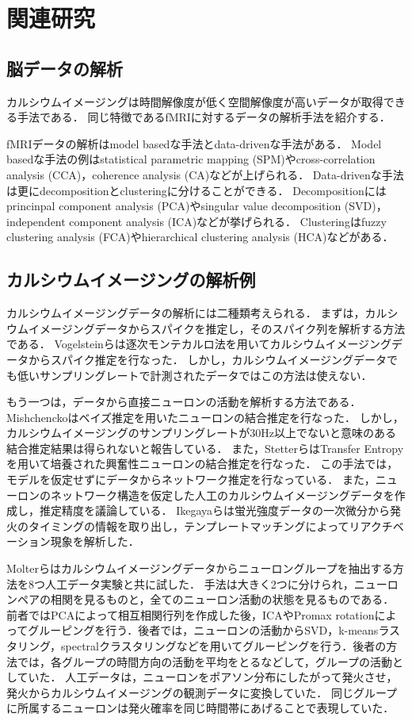 \section{関連研究}
\subsection{脳データの解析}
カルシウムイメージングは時間解像度が低く空間解像度が高いデータが取得できる手法である．
同じ特徴であるfMRIに対するデータの解析手法を紹介する．

fMRIデータの解析はmodel basedな手法とdata-drivenな手法がある\cite{Li2009}．
Model basedな手法の例はstatistical parametric mapping (SPM)やcross-correlation analysis (CCA)，coherence analysis (CA)などが上げられる．
Data-drivenな手法は更にdecompositionとclusteringに分けることができる．
Decompositionにはprincinpal component analysis (PCA)やsingular value decomposition (SVD)，independent component analysis (ICA)などが挙げられる．
Clusteringはfuzzy clustering analysis (FCA)やhierarchical clustering analysis (HCA)などがある．

\subsection{カルシウムイメージングの解析例}
カルシウムイメージングデータの解析には二種類考えられる．
まずは，カルシウムイメージングデータからスパイクを推定し，そのスパイク列を解析する方法である．
Vogelsteinらは逐次モンテカルロ法を用いてカルシウムイメージングデータからスパイク推定を行なった\cite{Vogelstein2009}．
しかし，カルシウムイメージングデータでも低いサンプリングレートで計測されたデータではこの方法は使えない．

もう一つは，データから直接ニューロンの活動を解析する方法である．
Mishchenckoはベイズ推定を用いたニューロンの結合推定を行なった\cite{Mishchencko2011}．
しかし，カルシウムイメージングのサンプリングレートが30Hz以上でないと意味のある結合推定結果は得られないと報告している．
また，StetterらはTransfer Entropyを用いて培養された興奮性ニューロンの結合推定を行なった\cite{Stetter2012}．
この手法では，モデルを仮定せずにデータからネットワーク推定を行なっている．
また，ニューロンのネットワーク構造を仮定した人工のカルシウムイメージングデータを作成し，推定精度を議論している．
Ikegayaらは蛍光強度データの一次微分から発火のタイミングの情報を取り出し，テンプレートマッチングによってリアクチベーション現象を解析した\cite{Ikegaya2004}．

Molterらはカルシウムイメージングデータからニューロングループを抽出する方法を8つ人工データ実験と共に試した\cite{Molter2018}．
手法は大きく2つに分けられ，ニューロンペアの相関を見るものと，全てのニューロン活動の状態を見るものである．
前者ではPCAによって相互相関行列を作成した後，ICAやPromax rotationによってグルーピングを行う．後者では，ニューロンの活動からSVD，k-meansラスタリング，spectralクラスタリングなどを用いてグルーピングを行う．後者の方法では，各グループの時間方向の活動を平均をとるなどして，グループの活動としていた．
人工データは，ニューロンをポアソン分布にしたがって発火させ，発火からカルシウムイメージングの観測データに変換していた．
同じグループに所属するニューロンは発火確率を同じ時間帯にあげることで表現していた．

